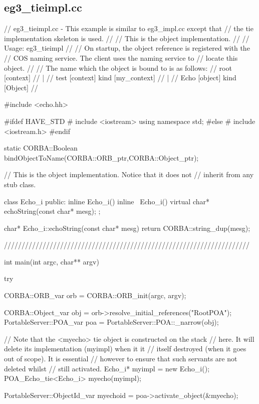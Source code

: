 \documentclass[11pt,twoside,a4paper]{book}
\begin{document}
\clearpage
\subsection{eg3\_tieimpl.cc}

\begin{cxxlisting}
// eg3_tieimpl.cc - This example is similar to eg3_impl.cc except that
//                  the tie implementation skeleton is used.
//
//               This is the object implementation.
//
// Usage: eg3_tieimpl
//
//        On startup, the object reference is registered with the 
//        COS naming service. The client uses the naming service to
//        locate this object.
//
//        The name which the object is bound to is as follows:
//              root  [context]
//               |
//              test  [context] kind [my_context]
//               |
//              Echo  [object]  kind [Object]
//

#include <echo.hh>

#ifdef HAVE_STD
#  include <iostream>
   using namespace std;
#else
#  include <iostream.h>
#endif

static CORBA::Boolean bindObjectToName(CORBA::ORB_ptr,CORBA::Object_ptr);


// This is the object implementation.  Notice that it does not
// inherit from any stub class.

class Echo_i {
public:
  inline Echo_i() {}
  inline ~Echo_i() {}
  virtual char* echoString(const char* mesg);
};


char* Echo_i::echoString(const char* mesg)
{
  return CORBA::string_dup(mesg);
}

//////////////////////////////////////////////////////////////////////

int main(int argc, char** argv)
{
  try {
    CORBA::ORB_var orb = CORBA::ORB_init(argc, argv);

    CORBA::Object_var obj = orb->resolve_initial_references("RootPOA");
    PortableServer::POA_var poa = PortableServer::POA::_narrow(obj);

    // Note that the <myecho> tie object is constructed on the stack
    // here. It will delete its implementation (myimpl) when it it
    // itself destroyed (when it goes out of scope).  It is essential
    // however to ensure that such servants are not deleted whilst
    // still activated.
    Echo_i* myimpl = new Echo_i();
    POA_Echo_tie<Echo_i> myecho(myimpl);

    PortableServer::ObjectId_var myechoid = poa->activate_object(&myecho);

}}
\end{cxxlisting}
\end{document}
